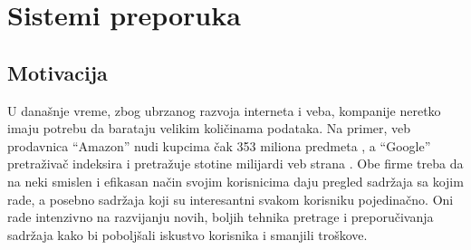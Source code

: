 \documentclass[a4paper]{article}
\begin{document}








\section{Sistemi preporuka}
\label{sec:sistemi_preporuka}

\subsection{Motivacija}
\label{subsec:motivacija}

U današnje vreme, zbog ubrzanog razvoja interneta i veba, kompanije neretko imaju potrebu da barataju velikim količinama podataka. Na primer, veb prodavnica ``Amazon'' nudi kupcima čak 353 miliona predmeta \cite{noauthor_57_2022}, a ``Google'' pretraživač indeksira i pretražuje stotine milijardi veb strana \cite{noauthor_organizing_nodate}. Obe firme treba da na neki smislen i efikasan način svojim korisnicima daju pregled sadržaja sa kojim rade, a posebno sadržaja koji su interesantni svakom korisniku pojedinačno. Oni rade intenzivno na razvijanju novih, boljih tehnika pretrage i preporučivanja sadržaja kako bi poboljšali iskustvo korisnika i smanjili troškove.
\end{document}
